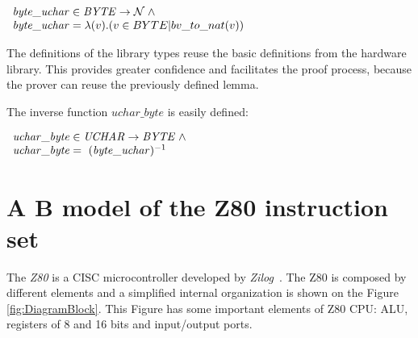 \documentclass[11pt]{article} %
\begin{document}
$
\begin{array}{l}
\mathit{byte\_uchar} \in \mathit{BYTE} \fun \nat \land \\
\mathit{byte\_uchar} = \lambda (v) . ( v \in BYTE | bv\_to\_nat(v) )
\end{array}
$

The definitions of the library types reuse the basic definitions from the hardware library. This provides
greater confidence and facilitates the proof process, because the prover can reuse the previously defined
lemma.


The inverse function $\mathit{uchar\_byte}$ is easily defined:

$
\begin{array}{l}
\mathit{uchar\_byte} \in \mathit{UCHAR}  \rightarrow  \mathit{BYTE}  \mathrel{\wedge} \\
   \mathit{uchar\_byte} = \ (\mathit{byte\_uchar}) ^{-1}
\end{array}
$

%



\section{A B model of the Z80 instruction set}
\label{sec:z80}

The \textit{Z80} is a CISC microcontroller developed by
\textit{Zilog}~\cite{Z80_manual}. The Z80 is composed by different elements and a
simplified internal organization is shown on the Figure \ref{fig:DiagramBlock}.
This Figure has some important elements of Z80 CPU: ALU, registers of 8 and 16
bits and input/output ports.
\end{document}
